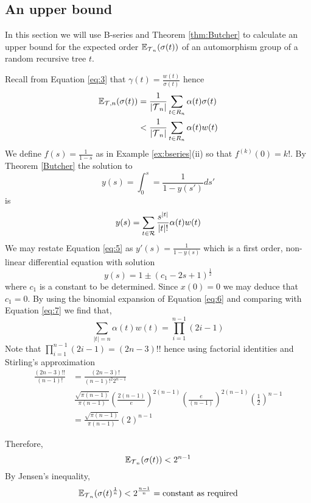 \subsection{An upper bound}
In this section we will use B-series and Theorem \ref{thm:Butcher} to calculate an upper bound for the expected order 
$\mathbb{E}_{\operatorname{\mathcal{T}}_n}(\sigma(t))$ of an automorphism group of a random recursive tree $t$.  

Recall from Equation \ref{eq:3} that $\gamma(t) = \frac{w(t)}{\sigma(t)}$ hence
\begin{align}
 \mathbb{E}_{\operatorname{\mathcal{T}},n}(\sigma(t))  &= \frac{1}{\lvert \operatorname{\mathcal{T}}_n \rvert} \sum_{t \in R_n} \alpha(t)\sigma(t)  \\
 &< \frac{1}{\lvert \operatorname{\mathcal{T}}_n \rvert} \sum_{t \in R_n} \alpha(t)w(t)
\end{align}
We define $f(s)= \frac{1}{1-s}$ as in Example \ref{ex:bseries}(ii) so that  $f^{(k)}(0) = k!$.  By Theorem \ref{Butcher} the solution to 
\begin{equation}\label{eq:5}
 y(s) = \int_0^s = \frac{1}{1-y(s')} ds'
\end{equation}
is
\begin{equation}\label{eq:7}
 y(s) = \sum_{t \in \operatorname{\mathcal{R}}} \frac{s^{\lvert t \rvert}}{\lvert t \rvert !}\alpha(t)w(t)
\end{equation}
We may restate Equation \ref{eq:5} as $y'(s) = \frac{1}{1-y(s)}$ which is a first order, non-linear differential equation with 
solution
\begin{equation}\label{eq:6}
  y(s) = 1 \pm (c_1 -2s +1)^{\frac{1}{2}}
\end{equation}
where $c_1$ is a constant to be determined.  Since $x(0) = 0$ we may deduce that $c_1 = 0$.  By using the 
binomial expansion of Equation \ref{eq:6} and comparing with Equation \ref{eq:7} we find that,
\[
 \sum_{\lvert t \rvert = n}\alpha(t)w(t) = \prod_{i=1}^{n-1} (2i-1)
\]
Note that $\prod_{i=1}^{n-1} (2i-1) = (2n-3)!!$ hence using factorial identities and Stirling's approximation 
\begin{align}
 \frac{(2n-3)!!}{(n-1)!} &= \frac{(2n - 3)!}{(n-1)!^2 2^{n-1}} \\
 &~ \frac{\sqrt{\pi(n-1)}}{\pi(n-1)} \left(\frac{2(n-1)}{e} \right)^{2(n-1)} \left(\frac{e}{(n-1)} \right)^{2(n-1)} \left( \frac{1}{2} \right)^{n-1} \\
 &= \frac{\sqrt{\pi(n-1)}}{\pi(n-1)} \left( 2 \right)^{n-1}
\end{align}

Therefore,
\[
 \mathbb{E}_{\operatorname{\mathcal{T}}_n}(\sigma(t)) < 2^{n-1} 
\]
By Jensen's inequality,  %
\[
 \mathbb{E}_{\operatorname{\mathcal{T}}_n}(\sigma(t)^{\frac{1}{n}}) < 2^{\frac{n-1}{n}} = \text{constant as required}
\]
 
